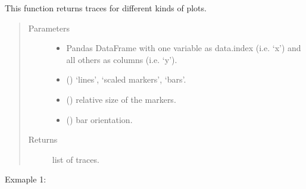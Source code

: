 \documentclass[letterpaper,10pt,english]{sphinxmanual}
\begin{document}
\begin{fulllineitems}
\label{\detokenize{_autosummary/analytics_core.viz:analytics_core.viz.viz.getPlotTraces}}
This function returns traces for different kinds of plots.
\begin{quote}\begin{description}
\item[{Parameters}] \leavevmode\begin{itemize}
\item {} 
 \textendash{} Pandas DataFrame with one variable as data.index (i.e. ‘x’) and all others as columns (i.e. ‘y’).

\item {} 
 () \textendash{} ‘lines’, ‘scaled markers’, ‘bars’.

\item {} 
 () \textendash{} relative size of the markers.

\item {} 
 () \textendash{} bar orientation.

\end{itemize}

\item[{Returns}] \leavevmode
list of traces.

\end{description}\end{quote}

Exmaple 1:

\begin{sphinxVerbatim}[commandchars=\\\{\}]
       
\end{sphinxVerbatim}


\end{fulllineitems}
\end{document}
